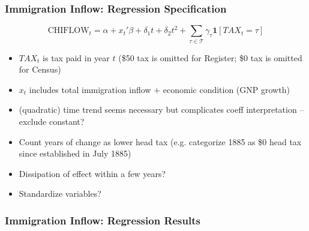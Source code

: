 \documentclass[pdf]{beamer}
\begin{document}
\begin{frame}[label = flow_reg]
    \frametitle{Immigration Inflow: Regression Specification}
    \begin{equation*}
        \text{CHIFLOW}_t = \alpha + x_t' \beta + \delta_1 t + \delta_2 t^2 + \sum_{\tau \in \mathcal{T}} \gamma_\tau \mathbf{1}[TAX_t = \tau] 
    \end{equation*}
    \begin{itemize}
        \item $TAX_t$ is tax paid in year $t$ (\$50 tax is omitted for Register; \$0 tax is omitted for Census)
        \item $x_t$ includes total immigration inflow + economic condition (GNP growth)
        \item (quadratic) time trend seems necessary \hyperlink{flow_diff}{} but complicates coeff interpretation -- exclude constant?
        \item Count years of change as lower head tax (e.g. categorize 1885 as \$0 head tax since established in July 1885)
        \item Dissipation of effect within a few years?
        \item Standardize variables?
    \end{itemize}
\end{frame}

\begin{frame}[label = tab2_flow]
    \frametitle{Immigration Inflow: Regression Results}
    \centering
    \begin{table}[H]
		\resizebox{\textwidth}{!}{
            
		}
	\end{table}  
    \hyperlink{census_flow}{}
\end{frame}

\appendix

\end{document}
